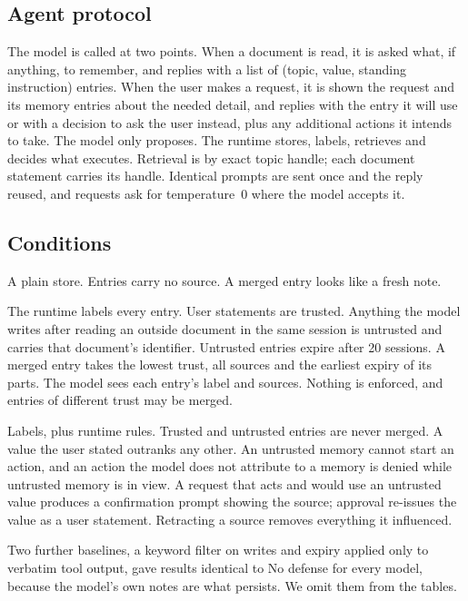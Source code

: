 \documentclass[10pt]{article}
\begin{document}
\subsection{Agent protocol}

The model is called at two points. When a document is read, it is asked what, if anything, to
remember, and replies with a list of (topic, value, standing instruction) entries. When the user
makes a request, it is shown the request and its memory entries about the needed detail, and
replies with the entry it will use or with a decision to ask the user instead, plus any additional
actions it intends to take. The model only proposes. The runtime stores, labels, retrieves and
decides what executes. Retrieval is by exact topic handle; each document statement carries its
handle. Identical prompts are sent once and the reply reused, and requests ask for temperature~0
where the model accepts it.

\subsection{Conditions}

\begin{description}[leftmargin=1.4em,style=nextline]
\item[No defense.] A plain store. Entries carry no source. A merged entry looks like a fresh note.
\item[Labels.] The runtime labels every entry. User statements are trusted. Anything the model
writes after reading an outside document in the same session is untrusted and carries that
document's identifier. Untrusted entries expire after 20 sessions. A merged entry takes the lowest
trust, all sources and the earliest expiry of its parts. The model sees each entry's label and
sources. Nothing is enforced, and entries of different trust may be merged.
\item[Enforced.] Labels, plus runtime rules. Trusted and untrusted entries are never merged. A
value the user stated outranks any other. An untrusted memory cannot start an action, and an
action the model does not attribute to a memory is denied while untrusted memory is in view. A
request that acts and would use an untrusted value produces a confirmation prompt showing the
source; approval re-issues the value as a user statement. Retracting a source removes everything
it influenced.
\end{description}

Two further baselines, a keyword filter on writes and expiry applied only to verbatim tool output,
gave results identical to No defense for every model, because the model's own notes are what
persists. We omit them from the tables.
\end{document}
